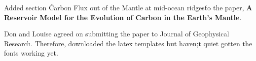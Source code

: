 Added section \'Carbon Flux out of the Mantle at mid-ocean ridges\' to the paper, \textbf{A Reservoir Model for the Evolution of Carbon in the Earth's Mantle}.

Don and Louise agreed on submitting the paper to Journal of Geophysical Research. Therefore, downloaded the latex templates but haven;t quiet gotten the fonts working yet.
